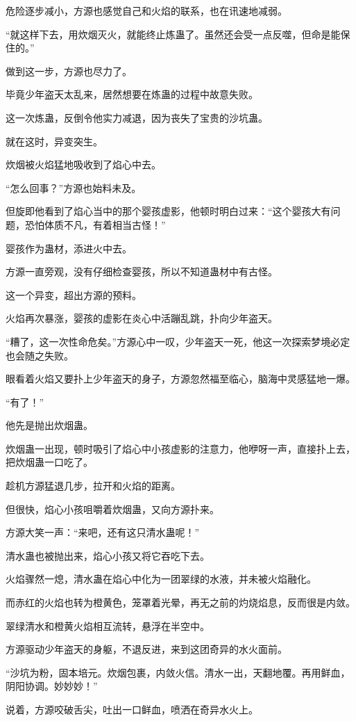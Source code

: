 \begin{this_body}
危险逐步减小，方源也感觉自己和火焰的联系，也在讯速地减弱。

“就这样下去，用炊烟灭火，就能终止炼蛊了。虽然还会受一点反噬，但命是能保住的。”

做到这一步，方源也尽力了。

毕竟少年盗天太乱来，居然想要在炼蛊的过程中故意失败。

这一次炼蛊，反倒令他实力减退，因为丧失了宝贵的沙坑蛊。

就在这时，异变突生。

炊烟被火焰猛地吸收到了焰心中去。

“怎么回事？”方源也始料未及。

但旋即他看到了焰心当中的那个婴孩虚影，他顿时明白过来：“这个婴孩大有问题，恐怕体质不凡，有着相当古怪！”

婴孩作为蛊材，添进火中去。

方源一直旁观，没有仔细检查婴孩，所以不知道蛊材中有古怪。

这一个异变，超出方源的预料。

火焰再次暴涨，婴孩的虚影在炎心中活蹦乱跳，扑向少年盗天。

“糟了，这一次性命危矣。”方源心中一叹，少年盗天一死，他这一次探索梦境必定也会随之失败。

眼看着火焰又要扑上少年盗天的身子，方源忽然福至临心，脑海中灵感猛地一爆。

“有了！”

他先是抛出炊烟蛊。

炊烟蛊一出现，顿时吸引了焰心中小孩虚影的注意力，他咿呀一声，直接扑上去，把炊烟蛊一口吃了。

趁机方源猛退几步，拉开和火焰的距离。

但很快，焰心小孩咀嚼着炊烟蛊，又向方源扑来。

方源大笑一声：“来吧，还有这只清水蛊呢！”

清水蛊也被抛出来，焰心小孩又将它吞吃下去。

火焰骤然一熄，清水蛊在焰心中化为一团翠绿的水液，并未被火焰融化。

而赤红的火焰也转为橙黄色，笼罩着光晕，再无之前的灼烧焰息，反而很是内敛。

翠绿清水和橙黄火焰相互流转，悬浮在半空中。

方源驱动少年盗天的身躯，不退反进，来到这团奇异的水火面前。

“沙坑为粉，固本培元。炊烟包裹，内敛火信。清水一出，天翻地覆。再用鲜血，阴阳协调。妙妙妙！”

说着，方源咬破舌尖，吐出一口鲜血，喷洒在奇异水火上。


\end{this_body}
